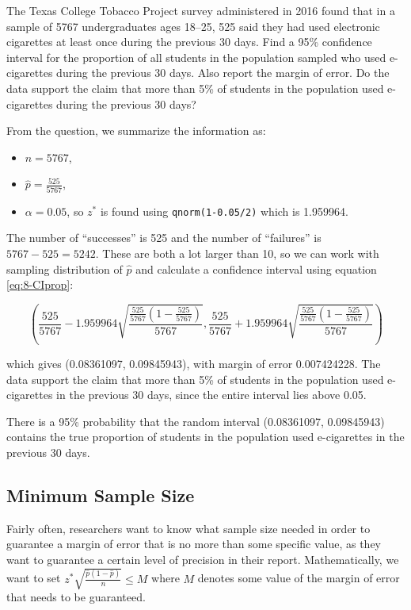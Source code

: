 \documentclass[
]{book}
\providecommand{\tightlist}{%
  \setlength{\itemsep}{0pt}\setlength{\parskip}{0pt}}
\begin{document}
The Texas College Tobacco Project survey administered in 2016 found that in a sample of 5767 undergraduates ages 18--25, 525 said they had used electronic cigarettes at least once during the previous 30 days. Find a 95\% confidence interval for the proportion of all students in the population sampled who used e-cigarettes during the previous 30 days. Also report the margin of error. Do the data support the claim that more than 5\% of students in the population used e-cigarettes during the previous 30 days?

From the question, we summarize the information as:

\begin{itemize}
\tightlist
\item
  \(n = 5767\),
\item
  \(\hat{p} = \frac{525}{5767}\),
\item
  \(\alpha = 0.05\), so \(z^*\) is found using \texttt{qnorm(1-0.05/2)} which is 1.959964.
\end{itemize}

The number of ``successes'' is 525 and the number of ``failures'' is \(5767-525 = 5242\). These are both a lot larger than 10, so we can work with sampling distribution of \(\hat{p}\) and calculate a confidence interval using equation \eqref{eq:8-CIprop}:

\[
\left( \frac{525}{5767} - 1.959964 \sqrt{\frac{\frac{525}{5767}(1-\frac{525}{5767})}{5767}} , \frac{525}{5767} + 1.959964 \sqrt{\frac{\frac{525}{5767}(1-\frac{525}{5767})}{5767}} \right)
\]

which gives (0.08361097, 0.09845943), with margin of error 0.007424228. The data support the claim that more than 5\% of students in the population used e-cigarettes in the previous 30 days, since the entire interval lies above 0.05.

There is a 95\% probability that the random interval (0.08361097, 0.09845943) contains the true proportion of students in the population used e-cigarettes in the previous 30 days.

\subsection{Minimum Sample Size}\label{minimum-sample-size}

Fairly often, researchers want to know what sample size needed in order to guarantee a margin of error that is no more than some specific value, as they want to guarantee a certain level of precision in their report. Mathematically, we want to set \(z^{*} \sqrt{\frac{\hat{p}(1-\hat{p})}{n}} \leq M\) where \(M\) denotes some value of the margin of error that needs to be guaranteed.
\end{document}
